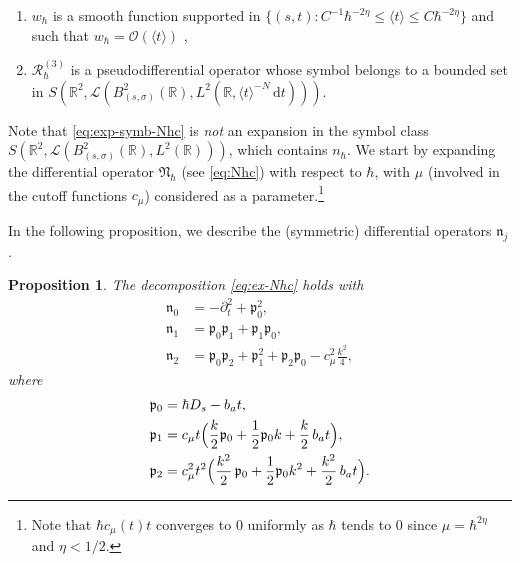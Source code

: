\documentclass[JEP,XML,SOM,Unicode,NoFloatCountersInSection,published]{cedram}
\let\sep:
\newcommand{\rd}{\,\mathrm{d}}
\theoremstyle{plain}
\newtheorem{proposition}[theorem]{Proposition}
\theoremstyle{definition}
\newcommand{\R}{\mathbb{R}}
\begin{document}
\begin{enumerate}
\item\label{eq.i} $w_{\hbar}$ is a smooth function supported in $\{(s,t) \sep C^{-1}\hbar^{-2\eta}\leq \langle t\rangle\leq C\hbar^{-2\eta}\}$ and such that $w_\hbar=\mathscr{O}(\langle t\rangle)$ ,
\item \label{eq.ii}$\mathscr R_\hbar^{(3)}$ is a pseudodifferential operator whose symbol belongs to a bounded set in $S(\R^2,\mathscr{L}(B_{(s,\sigma)}^2(\R),L^2(\R,\langle t\rangle^{-N}\rd t)))$.
\end{enumerate}
Note that \eqref{eq:exp-symb-Nhc} is {\it not} an expansion in the symbol class $S(\R^2,\mathscr{L}(B_{(s,\sigma)}^2(\R),L^2(\R)))$, which contains $n_{\hbar}$.
We start by expanding the differential operator $\mathfrak{N}_{\hbar}$ (see \eqref{eq:Nhc}) with respect to $\hbar$, with $\mu$ (involved in the cutoff functions $c_\mu$) considered as a parameter.\footnote{Note that $\hbar c_{\mu}(t)t$ converges to $0$ uniformly as $\hbar$ tends to $0$ since $\mu=\hbar^{2\eta}$ and $\eta<1/2$.}

In the following proposition, we describe the (symmetric) differential operators $\mathfrak{n}_j$.
\begin{proposition}
The decomposition \eqref{eq:ex-Nhc} holds with
\begin{equation}\label{eq:ex-terms}
\begin{aligned}
\mathfrak n_0&=-\partial_t^2+\mathfrak{p}_0^2,\\
\mathfrak n_1&=\mathfrak p_0\mathfrak p_1+\mathfrak p_1\mathfrak p_0,\\
\mathfrak n_2&=\mathfrak p_0\mathfrak p_2+\mathfrak p_1^2+\mathfrak p_2\mathfrak p_0-c_\mu^2\frac{k^2}{4},
\end{aligned}
\end{equation} 
where
\begin{equation}\label{eq:D-theta}
\begin{aligned}
\mathfrak{p}_0&=\hbar D_s-b_a t,\\
\mathfrak{p}_1 &=c_\mu t\Bigl(\frac{k}2\mathfrak p_0+\frac12\mathfrak p_0k+\frac{k}2\, b_at \Bigr),\\
\mathfrak{p}_2&=c_\mu^2t^2\Bigl(\frac{k^2}{2}\,\mathfrak p_0+\frac12\mathfrak p_0k^2+\frac{k^2}2\,b_at \Bigr).
\end{aligned}
\end{equation}
\end{proposition}
\end{document}
